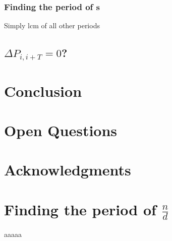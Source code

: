\documentclass[11pt,titlepage]{article}
\begin{document}
\subsubsection{Finding the period of $\pmb{s}$}
Simply lcm of all other periods






\subsection{$\Delta P_{i, i + T} = 0$?}

\section{Conclusion}

\section{Open Questions}


\section*{Acknowledgments}


\appendix
\section{Finding the period of $\frac{n}{d}$}
\label{AppendixPeriod}
aaaaa



\end{document}
